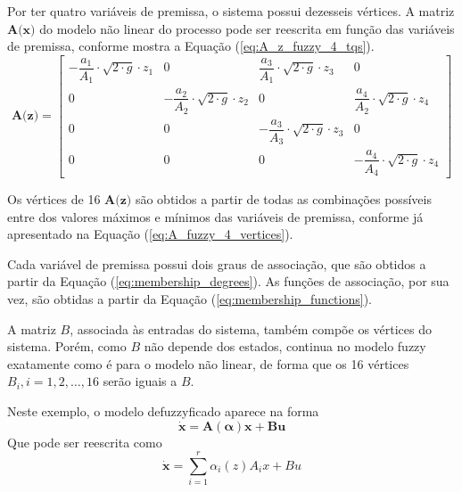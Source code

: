 Por ter quatro variáveis de premissa, o sistema possui dezesseis vértices. A matriz $\textbf{A(x)}$ do modelo não linear do processo pode ser reescrita em função das variáveis de premissa, conforme mostra a Equação (\ref{eq:A_z_fuzzy_4_tqs}).
\begin{equation}\label{eq:A_z_fuzzy_4_tqs}
\textbf{A(z)} =\begin{bmatrix}-\dfrac{a_1}{A_1}\cdot \sqrt{2\cdot g}\cdot z_1&0
&\dfrac{a_3}{A_1}\cdot \sqrt{2\cdot g}\cdot z_3&0
\\0&-\dfrac{a_2}{A_2}\cdot \sqrt{2\cdot g }\cdot z_2
&0&\dfrac{a_4}{A_2}\cdot \sqrt{2\cdot g}\cdot z_4
\\0&0&-\dfrac{a_3}{A_3}\cdot \sqrt{2\cdot g}\cdot z_3&0
\\0&0&0&-\dfrac{a_4}{A_4}\cdot \sqrt{2\cdot g }\cdot z_4\end{bmatrix}
\end{equation}

Os vértices de 16 $\textbf{A(z)}$ são obtidos a partir de todas as combinações possíveis entre dos valores máximos e mínimos das variáveis de premissa, conforme já apresentado na Equação (\ref{eq:A_fuzzy_4_vertices}).

Cada variável de premissa possui dois graus de associação, que são obtidos a partir da Equação (\ref{eq:membership_degrees}). As funções de associação, por sua vez, são obtidas a partir da Equação (\ref{eq:membership_functions}).

A matriz $B$, associada às entradas do sistema, também compõe os vértices do sistema. Porém, como $B$ não depende dos estados, continua no modelo fuzzy exatamente como é para o modelo não linear, de forma que os 16 vértices $B_i, i = 1, 2,\hdots, 16$ serão iguais a $B$.

Neste exemplo, o modelo defuzzyficado aparece na forma
\begin{equation}\label{eq:fuzzyTS_system_with_B}
\mathbf{\dot{x}} = \mathbf{A(\alpha)x+Bu}
\end{equation}
Que pode ser reescrita como
\begin{equation}\label{eq:A_alpha_B}
\mathbf{\dot{x}} = \sum_{i=1}^{r} \alpha_i(z) A_ix + Bu
\end{equation}

